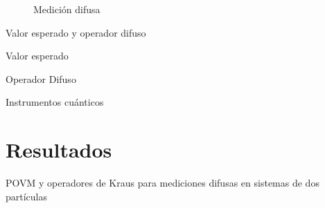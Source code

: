 \documentclass[svgnames,12pt,aspectratio=149]{beamer}
\begin{document}
\begin{frame}   \begin{figure}[H]
\centering
{}

\caption{Medición difusa} \label{fig:lego}
\end{figure} 

    
\end{frame}

\begin{frame}{Valor esperado y operador difuso}
    \begin{block}{Valor esperado}
      
    \end{block}
    \begin{block}{Operador Difuso}
      
    \end{block}
\end{frame}

\begin{frame}{Instrumentos cuánticos}
    
\end{frame}


\section{Resultados}
\begin{frame}{POVM y operadores de Kraus para mediciones difusas en sistemas de dos partículas}
    
\end{frame}
\end{document}
